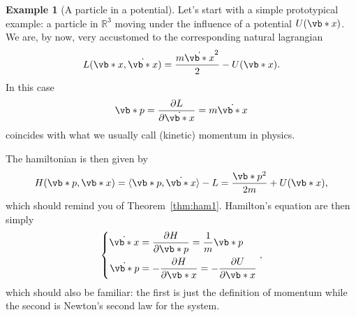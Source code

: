 \documentclass[english,fontsize=11pt,paper=b5]{scrbook}
\theoremstyle{definition}
\newtheorem{example}{Example}[chapter]
\begin{document}
    \begin{example}[A particle in a potential]\label{ex:hamPot}
      Let's start with a simple prototypical example: a particle in $\mathbb{R}^3$ moving under the influence of a potential $U(\vb*{x})$.
      We are, by now, very accustomed to the corresponding natural lagrangian
      \begin{equation}
        L(\vb*{x},\dot{\vb*{x}}) = \frac{m \dot{\vb*{x}}^2}{2} - U(\vb*{x}).
      \end{equation}
      In this case
      \begin{equation}
        \vb*{p} = \frac{\partial L}{\partial \dot{\vb*{x}}} = m \dot{\vb*{x}}
      \end{equation}
      coincides with what we usually call (kinetic) momentum in physics.

      The hamiltonian is then given by
      \begin{equation}
        H(\vb*{p},\vb*{x}) = \langle\vb*{p}, \dot{\vb*{x}}\rangle - L = \frac {\vb*{p}^2}{2m} + U(\vb*{x}),
      \end{equation}
      which should remind you of Theorem~\ref{thm:ham1}.
      Hamilton's equation are then simply
      \begin{equation}
        \left\lbrace
          \begin{aligned}
            \dot{\vb*{x}}   & = \frac{\partial H}{\partial \vb*{p}} = \frac1m \vb*{p}                        \\
            \dot {\vb*{p}} & = - \frac{\partial H}{\partial \vb*{x}} = -\frac{\partial U}{\partial \vb*{x}}
          \end{aligned}
        \right.,
      \end{equation}
      which should also be familiar: the first is just the definition of momentum while the second is Newton's second law for the system.
    \end{example}
\end{document}
